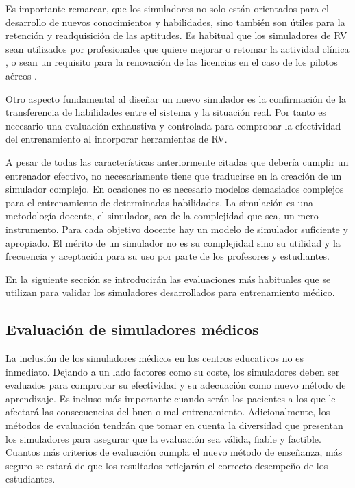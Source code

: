 Es importante remarcar, que los simuladores no solo están orientados para el desarrollo de nuevos conocimientos y habilidades, sino también son útiles para la retención y readquisición de las aptitudes. Es habitual que los simuladores de \ac{RV} sean utilizados por profesionales que quiere mejorar o retomar la actividad clínica \cite{Atesok}, o sean un requisito para la renovación de las licencias en el caso de los pilotos aéreos \cite{normativa}. 


Otro aspecto fundamental al diseñar un nuevo simulador es la confirmación de la transferencia de habilidades entre el sistema y la situación real. Por tanto es necesario una evaluación exhaustiva y controlada para comprobar la efectividad del entrenamiento al incorporar herramientas de \ac{RV}\cite{AIM2016224}.

A pesar de todas las características anteriormente citadas que debería cumplir un entrenador efectivo, no necesariamente tiene que traducirse en la creación de un simulador complejo. En ocasiones no es necesario modelos demasiados complejos para el entrenamiento de determinadas habilidades. La simulación es una metodología docente, el simulador, sea de la complejidad que sea, un mero instrumento. Para cada objetivo docente hay un modelo de simulador suficiente y apropiado. El mérito de un simulador no es su complejidad sino su utilidad y la frecuencia y aceptación para su uso por parte de los profesores y estudiantes. %

En la siguiente sección se introducirán las evaluaciones más habituales que se utilizan para validar los simuladores desarrollados para entrenamiento médico.



\subsection{Evaluación de simuladores médicos}

La inclusión de los simuladores médicos en los centros educativos no es inmediato. Dejando a un lado factores como su coste, los simuladores deben ser evaluados para comprobar su efectividad y su adecuación como nuevo método de aprendizaje. Es incluso más importante cuando serán los pacientes a los que le afectará las consecuencias del buen o mal entrenamiento.
Adicionalmente, los métodos de evaluación tendrán que tomar en cuenta la diversidad que presentan los simuladores para asegurar que la evaluación sea válida, fiable y factible. 
Cuantos más criterios de evaluación cumpla el nuevo método de enseñanza, más seguro se estará de que los resultados reflejarán el correcto desempeño de los estudiantes.

